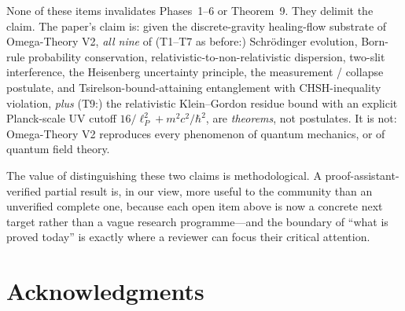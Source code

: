 \documentclass[11pt,a4paper,twoside]{article}
\theoremstyle{definition}
\newcommand{\lP}{\ell_P}
\begin{document}
None of these items invalidates Phases~1--6 or Theorem~9. They
delimit the claim. The paper's claim is: given the discrete-gravity
healing-flow substrate of Omega-Theory V2, \emph{all nine} of (T1--T7
as before:) Schr\"odinger evolution, Born-rule probability
conservation, relativistic-to-non-relativistic dispersion, two-slit
interference, the Heisenberg uncertainty principle, the measurement /
collapse postulate, and Tsirelson-bound-attaining entanglement with
CHSH-inequality violation, \emph{plus} (T9:) the relativistic
Klein--Gordon residue bound with an explicit Planck-scale UV cutoff
$16/\lP^{2} + m^{2}c^{2}/\hbar^{2}$, are \emph{theorems}, not
postulates. It is not: Omega-Theory V2 reproduces every phenomenon
of quantum mechanics, or of quantum field theory.

The value of distinguishing these two claims is methodological. A
proof-assistant-verified partial result is, in our view, more useful
to the community than an unverified complete one, because each open
item above is now a concrete next target rather than a vague research
programme---and the boundary of ``what is proved today'' is exactly
where a reviewer can focus their critical attention.

\section*{Acknowledgments}\label{sec:ack}
\end{document}
